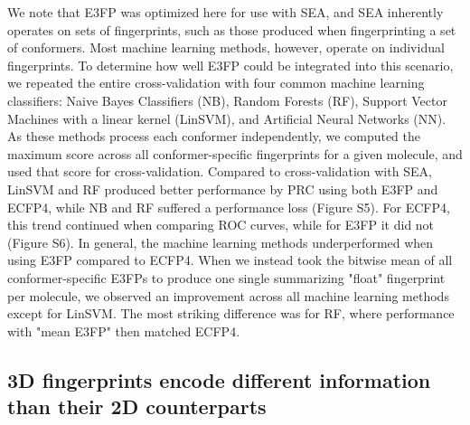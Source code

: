 \documentclass[../main.tex]{subfiles}
\begin{document}
\begin{refsection}
We note that E3FP was optimized here for use with SEA, and SEA inherently operates on sets of fingerprints, such as those produced when fingerprinting a set of conformers.
Most machine learning methods, however, operate on individual fingerprints.
To determine how well E3FP could be integrated into this scenario, we repeated the entire cross-validation with four common machine learning classifiers:
Naive Bayes Classifiers (NB), Random Forests (RF), Support Vector Machines with a linear kernel (LinSVM), and Artificial Neural Networks  (NN).
As these methods process each conformer independently, we computed the maximum score across all conformer-specific fingerprints for a given molecule, and used that score for cross-validation.
Compared to cross-validation with SEA, LinSVM and RF produced better performance by PRC using both E3FP and ECFP4, while NB and RF suffered a performance loss (Figure S5).
For ECFP4, this trend continued when comparing ROC curves, while for E3FP it did not (Figure S6).
In general, the machine learning methods underperformed when using E3FP compared to ECFP4.
When we instead took the bitwise mean of all conformer-specific E3FPs to produce one single summarizing "float"
fingerprint per molecule, we observed an improvement across all machine learning methods except for LinSVM.
The most striking difference was for RF, where performance with "mean E3FP" then matched ECFP4.

\subsection*{3D fingerprints encode different information than their 2D counterparts}


\end{refsection}
\end{document}

